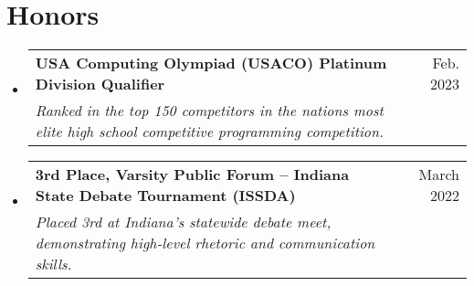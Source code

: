 \documentclass[letterpaper,11pt]{article}
\makeatletter
\newcommand{\resumeSubheading}[4]{
  \vspace{-2pt}\item
    \begin{tabular*}{0.97\textwidth}[t]{l@{\extracolsep{\fill}}r}
      \textbf{#1} & #2 \\
      \textit{\small#3} & \textit{\small #4} \\
    \end{tabular*}\vspace{-7pt}
}
\newcommand{\resumeSubHeadingListStart}{\begin{itemize}[leftmargin=0.15in, label={}]}
\newcommand{\resumeSubHeadingListEnd}{\end{itemize}}
\makeatother
\begin{document}
\section{Honors}
    \resumeSubHeadingListStart
    \resumeSubheading
    {USA Computing Olympiad (USACO) Platinum Division Qualifier}{Feb. 2023}
    {Ranked in the top 150 competitors in the nations most elite high school competitive programming competition.}{}
    \resumeSubheading
    {3rd Place, Varsity Public Forum – Indiana State Debate Tournament (ISSDA)}{March 2022}
    {Placed 3rd at Indiana’s statewide debate meet, demonstrating high-level rhetoric and communication skills.}{}
    \resumeSubHeadingListEnd

\begin{comment}
%
\section{Technical Skills}
 \begin{itemize}[leftmargin=0.15in, label={}]
    \small{\item{
     \textbf{Languages}{: C/C++, Java, Python, Bash, JavaScript, TypeScript, OCaml, R} \\
     \textbf{Developer Tools}{: Git, GitHub, UNIX, Docker, VS Code, Cloudfare, PyCharm, IntelliJ, LaTeX, Tpyst} \\
     \textbf{Libraries}{: pandas, NumPy, tensorflow, keras, PyTorch, scikit-learn, tensorflow, seaborn, Matplotlib, OpenGL}
    }}
 \end{itemize}
\end{comment}

\end{document}

